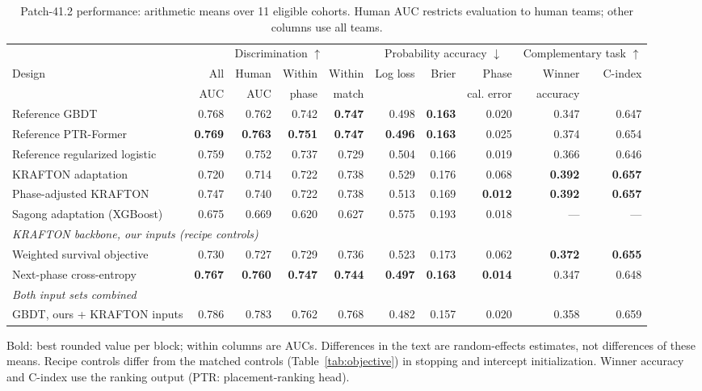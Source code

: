 \begin{table}[t]
\centering\footnotesize
\caption{Patch-41.2 performance: arithmetic means over 11 eligible cohorts. Human AUC restricts evaluation to human teams; other columns use all teams.}
\label{tab:main}
\setlength{\tabcolsep}{2.5pt}
\begin{tabular*}{\textwidth}{@{\extracolsep{\fill}}lrrrrrrrrr@{}}
\toprule
 & \multicolumn{4}{c}{Discrimination $\uparrow$} & \multicolumn{3}{c}{Probability accuracy $\downarrow$} & \multicolumn{2}{c}{Complementary task $\uparrow$} \\
\cmidrule(lr){2-5}\cmidrule(lr){6-8}\cmidrule(lr){9-10}
Design & All & Human & Within & Within & Log loss & Brier & Phase & Winner & C-index \\
 & AUC & AUC & phase & match & & & cal. error & accuracy & \\
\midrule
Reference GBDT & 0.768 & 0.762 & 0.742 & \textbf{0.747} & 0.498 & \textbf{0.163} & 0.020 & 0.347 & 0.647 \\
Reference PTR-Former & \textbf{0.769} & \textbf{0.763} & \textbf{0.751} & \textbf{0.747} & \textbf{0.496} & \textbf{0.163} & 0.025 & 0.374 & 0.654 \\
Reference regularized logistic & 0.759 & 0.752 & 0.737 & 0.729 & 0.504 & 0.166 & 0.019 & 0.366 & 0.646 \\
KRAFTON adaptation & 0.720 & 0.714 & 0.722 & 0.738 & 0.529 & 0.176 & 0.068 & \textbf{0.392} & \textbf{0.657} \\
Phase-adjusted KRAFTON & 0.747 & 0.740 & 0.722 & 0.738 & 0.513 & 0.169 & \textbf{0.012} & \textbf{0.392} & \textbf{0.657} \\
Sagong adaptation (XGBoost) & 0.675 & 0.669 & 0.620 & 0.627 & 0.575 & 0.193 & 0.018 & --- & --- \\
\midrule
\multicolumn{10}{l}{\emph{KRAFTON backbone, our inputs (recipe controls)}} \\
Weighted survival objective & 0.730 & 0.727 & 0.729 & 0.736 & 0.523 & 0.173 & 0.062 & \textbf{0.372} & \textbf{0.655} \\
Next-phase cross-entropy & \textbf{0.767} & \textbf{0.760} & \textbf{0.747} & \textbf{0.744} & \textbf{0.497} & \textbf{0.163} & \textbf{0.014} & 0.347 & 0.648 \\
\midrule
\multicolumn{10}{l}{\emph{Both input sets combined}} \\
GBDT, ours + KRAFTON inputs & 0.786 & 0.783 & 0.762 & 0.768 & 0.482 & 0.157 & 0.020 & 0.358 & 0.659 \\
\bottomrule
\end{tabular*}
\smallskip
\parbox{\textwidth}{\scriptsize Bold: best rounded value per block; within columns are AUCs. Differences in the text are random-effects estimates, not differences of these means. Recipe controls differ from the matched controls (Table~\ref{tab:objective}) in stopping and intercept initialization. Winner accuracy and C-index use the ranking output (PTR: placement-ranking head).}
\end{table}
